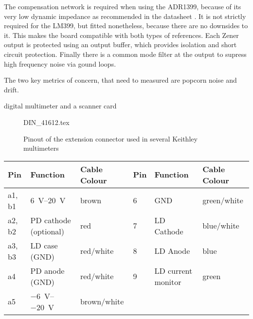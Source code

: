 The compensation network is required when using the ADR1399, because of its very low dynamic impedance as recommended in the datasheet \cite{datasheet_ADR1399}. It is not strictly required for the LM399, but fitted nonetheless, because there are no downsides to it. This makes the board compatible with both types of references. Each Zener output is protected using an output buffer, which provides isolation and short circuit protection. Finally there is a common mode filter at the output to supress high frequency noise via gound loops.

The two key metrics of concern, that need to measured are popcorn noise and drift.

digital multimeter and a scanner card


\begin{figure}[]
    \centering
    {DIN_41612.tex}
    \caption{Pinout of the extension connector used in several Keithley multimeters}
\end{figure}

\begin{tabular}{llllll}
    \toprule
    Pin    & Function    & Cable Colour    & Pin    & Function    &  Cable Colour\\
    \midrule
    a1, b1    & \SIrange[explicit-sign=+]{6}{20}{\volt}    & brown    & \num{6}    & GND    & green/white\\
    a2, b2    & PD cathode (optional)    & red    & \num{7}    & LD Cathode    & blue/white\\
    a3, b3    & LD case (GND)    & red/white    & \num{8}    & LD Anode    & blue\\
    a4    & PD anode (GND)    & red/white    & \num{9}    & LD current monitor    & green\\
    a5    & \SIrange{-6}{-20}{\volt}    & brown/white\\
    \bottomrule
\end{tabular}

